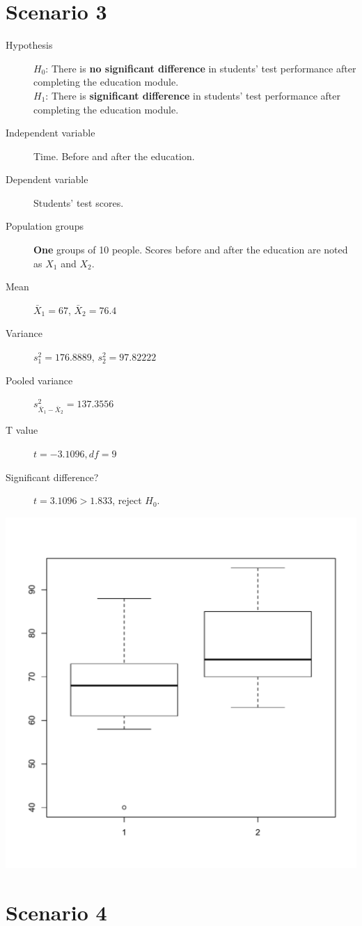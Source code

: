\documentclass[a4paper,10pt,twocolumn]{article}
\begin{document}
\section{Scenario 3} %
\label{sec:scenario_3}
\begin{description}
	\item[Hypothesis] 
		$H_0$: There is \textbf{no significant difference} in students' test performance after completing the education module.\\
		$H_1$: There is \textbf{significant difference} in students' test performance after completing the education module.
	\item[Independent variable] Time. Before and after the education.
	\item[Dependent variable] Students' test scores.
	\item[Population groups] \textbf{One} groups of 10 people. Scores before and after the education are noted as $X_1$ and $X_2$.
	\item[Mean] $\bar{X}_1=67$, $\bar{X}_2=76.4$
	\item[Variance] $s_1^2=176.8889$, $s_2^2=97.82222$
	\item[Pooled variance] $s_{\bar{X}_1-\bar{X}_2}^2=137.3556$
	\item[T value] $t = -3.1096, df = 9$
	\item[Significant difference?] $t = 3.1096 > 1.833$, reject $H_0$.
\end{description}
\includegraphics[width=.5\textwidth]{s3.pdf}

\section{Scenario 4} %
\label{sec:scenario_4}

\end{document}
